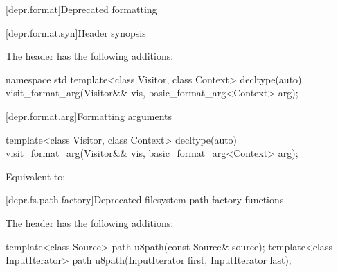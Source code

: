 [depr.format]{Deprecated formatting}

[depr.format.syn]{Header  synopsis}

\pnum
The header  has the following additions:

\begin{codeblock}
namespace std {
  template<class Visitor, class Context>
    decltype(auto) visit_format_arg(Visitor&& vis, basic_format_arg<Context> arg);
}
\end{codeblock}

[depr.format.arg]{Formatting arguments}

%
\begin{itemdecl}
template<class Visitor, class Context>
  decltype(auto) visit_format_arg(Visitor&& vis, basic_format_arg<Context> arg);
\end{itemdecl}

\begin{itemdescr}
\pnum
\effects
Equivalent to: 
\end{itemdescr}

[depr.fs.path.factory]{Deprecated filesystem path factory functions}

\pnum
The header  has the following additions:

%
\begin{itemdecl}
template<class Source>
  path u8path(const Source& source);
template<class InputIterator>
  path u8path(InputIterator first, InputIterator last);
\end{itemdecl}

